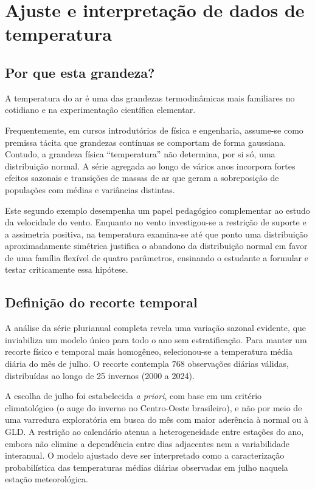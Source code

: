 \section{Ajuste e interpretação de dados de temperatura}\label{sec:temperatura}

\subsection{Por que esta grandeza?}

A temperatura do ar é uma das grandezas termodinâmicas mais familiares no cotidiano e na experimentação científica elementar.

Frequentemente, em cursos introdutórios de física e engenharia, assume-se como premissa tácita que grandezas contínuas se comportam de forma gaussiana. Contudo, a grandeza física ``temperatura'' não determina, por si só, uma distribuição normal. A série agregada ao longo de vários anos incorpora fortes efeitos sazonais e transições de massas de ar que geram a sobreposição de populações com médias e variâncias distintas.

Este segundo exemplo desempenha um papel pedagógico complementar ao estudo da velocidade do vento. Enquanto no vento investigou-se a restrição de suporte e a assimetria positiva, na temperatura examina-se até que ponto uma distribuição aproximadamente simétrica justifica o abandono da distribuição normal em favor de uma família flexível de quatro parâmetros, ensinando o estudante a formular e testar criticamente essa hipótese.

\subsection{Definição do recorte temporal}

A análise da série plurianual completa revela uma variação sazonal evidente, que inviabiliza um modelo único para todo o ano sem estratificação. Para manter um recorte físico e temporal mais homogêneo, selecionou-se a temperatura média diária do mês de julho. O recorte contempla $768$ observações diárias válidas, distribuídas ao longo de 25 invernos (2000 a 2024).

A escolha de julho foi estabelecida \textit{a priori}, com base em um critério climatológico (o auge do inverno no Centro-Oeste brasileiro), e não por meio de uma varredura exploratória em busca do mês com maior aderência à normal ou à GLD. A restrição ao calendário atenua a heterogeneidade entre estações do ano, embora não elimine a dependência entre dias adjacentes nem a variabilidade interanual. O modelo ajustado deve ser interpretado como a caracterização probabilística das temperaturas médias diárias observadas em julho naquela estação meteorológica.

